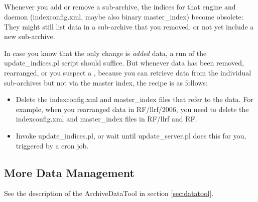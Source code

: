 \subsection{}
Whenever you add or remove a sub-archive, the indices for that engine
and daemon (indexconfig.xml, maybe also binary master\_index)
become obsolete: They might still list data in a
sub-archive that you removed, or not yet include a new
sub-archive.

In case you know that the only change is \emph{added} data, a run of the
update\_indices.pl script should suffice. But whenever data has been
removed, rearranged, or you suspect a ,
because you can retrieve data from the individual sub-archives but not
via the master index, the recipe is as follows:
\begin{itemize}
\item Delete the indexconfig.xml and master\_index files that refer to
      the data. For example, when you rearranged data in RF/llrf/2006,
      you need to delete the indexconfig.xml and master\_index files
      in RF/llrf and RF.
\item Invoke update\_indices.pl, or wait until update\_server.pl
      does this for you, triggered by a cron job.
\end{itemize}

\subsection{More Data Management}
See the description of the ArchiveDataTool in section \ref{sec:datatool}.
